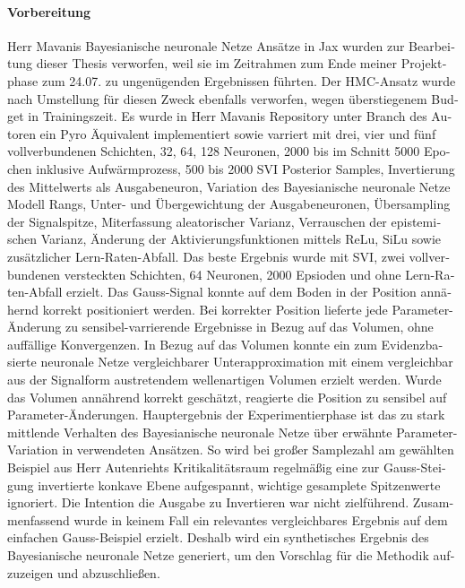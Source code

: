 \begin{otherlanguage}{ngerman}
\paragraph{Vorbereitung} Herr Mavanis \gls{Bayesianische neuronale Netze} Ansätze in Jax wurden zur Bearbeitung dieser Thesis verworfen, weil sie im Zeitrahmen zum Ende meiner Projektphase zum 24.07. zu ungenügenden Ergebnissen führten. Der HMC-Ansatz wurde nach Umstellung für diesen Zweck ebenfalls verworfen, wegen überstiegenem Budget in Trainingszeit. Es wurde in Herr Mavanis Repository unter Branch des Autoren ein Pyro Äquivalent implementiert sowie varriert mit drei, vier und fünf vollverbundenen Schichten, 32, 64, 128 Neuronen, 2000 bis im Schnitt 5000 Epochen inklusive Aufwärmprozess, 500 bis 2000 SVI Posterior Samples, Invertierung des Mittelwerts als Ausgabeneuron, Variation des \gls{Bayesianische neuronale Netze} Modell Rangs, Unter- und Übergewichtung der Ausgabeneuronen, Übersampling der Signalspitze, Miterfassung aleatorischer Varianz, Verrauschen der epistemischen Varianz, Änderung der Aktivierungsfunktionen mittels ReLu, SiLu sowie zusätzlicher Lern-Raten-Abfall. Das beste Ergebnis wurde mit SVI, zwei vollverbundenen versteckten Schichten, 64 Neuronen, 2000 Epsioden und ohne Lern-Raten-Abfall erzielt. Das Gauss-Signal konnte auf dem Boden in der Position annähernd korrekt positioniert werden. Bei korrekter Position lieferte jede Parameter-Änderung zu sensibel-varrierende Ergebnisse in Bezug auf das Volumen, ohne auffällige Konvergenzen. In Bezug auf das Volumen konnte ein zum \gls{Evidenzbasierte neuronale Netze} vergleichbarer Unterapproximation mit einem vergleichbar aus der Signalform austretendem wellenartigen Volumen erzielt werden. Wurde das Volumen annährend korrekt geschätzt, reagierte die Position zu sensibel auf Parameter-Änderungen. Hauptergebnis der Experimentierphase ist das zu stark mittlende Verhalten des \gls{Bayesianische neuronale Netze} über erwähnte Parameter-Variation in verwendeten Ansätzen. So wird bei großer Samplezahl am gewählten Beispiel aus Herr Autenriehts Kritikalitätsraum regelmäßig eine zur Gauss-Steigung invertierte konkave Ebene aufgespannt, wichtige gesamplete Spitzenwerte ignoriert. Die Intention die Ausgabe zu Invertieren war nicht zielführend. Zusammenfassend wurde in keinem Fall ein relevantes vergleichbares Ergebnis auf dem einfachen Gauss-Beispiel erzielt. Deshalb wird ein synthetisches Ergebnis des \gls{Bayesianische neuronale Netze} generiert, um den Vorschlag für die Methodik aufzuzeigen und abzuschließen.  




\end{otherlanguage}
